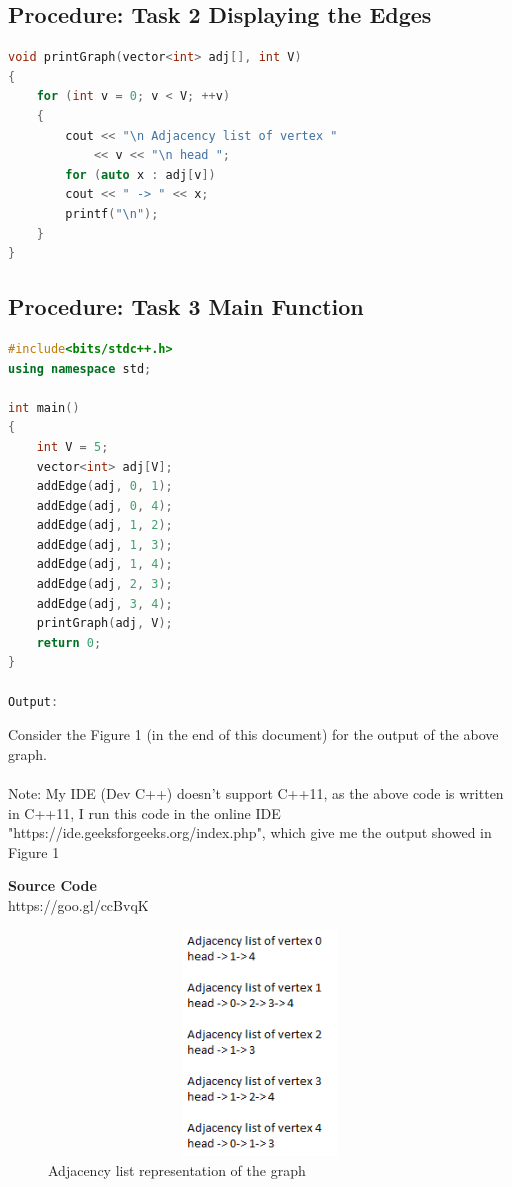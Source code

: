 \documentclass[11pt]{article}            %
\begin{document}
\subsection{Procedure: Task 2 Displaying the Edges}     
\begin{lstlisting}[language=C++]
void printGraph(vector<int> adj[], int V)
{
	for (int v = 0; v < V; ++v)
	{
		cout << "\n Adjacency list of vertex "
			<< v << "\n head ";
		for (auto x : adj[v])
		cout << " -> " << x;
		printf("\n");
	}
}
\end{lstlisting}

\subsection{Procedure: Task 3 Main Function}     
\begin{lstlisting}[language=C++]
#include<bits/stdc++.h>
using namespace std;

int main()
{
	int V = 5;
	vector<int> adj[V];
	addEdge(adj, 0, 1);
	addEdge(adj, 0, 4);
	addEdge(adj, 1, 2);
	addEdge(adj, 1, 3);
	addEdge(adj, 1, 4);
	addEdge(adj, 2, 3);
	addEdge(adj, 3, 4);
	printGraph(adj, V);
	return 0;
}

Output:
\end{lstlisting}
Consider the Figure 1 (in the end of this document) for the output of the above graph.\\~\\
Note: My IDE (Dev C++) doesn't support C++11, as the above code is written in C++11, I run this code in the online IDE "https://ide.geeksforgeeks.org/index.php", which give me the output showed in Figure 1

\textbf{Source Code} \\
https://goo.gl/ccBvqK

\begin{figure}[b!]
\centering
  \includegraphics[width=12cm,height=6cm,keepaspectratio]{1.png}
\caption{Adjacency list representation of the graph}
\label{Figure:1}    
\end{figure}
\end{document}
